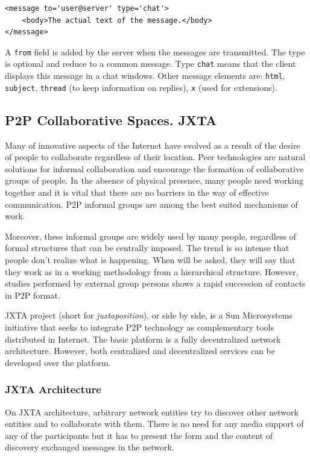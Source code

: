 \begin{verbatim}
<message to='user@server' type='chat'>
    <body>The actual text of the message.</body>
</message>
\end{verbatim}

A \texttt{from} field is added by the server when the messages are
transmitted. The type is optional and reduce to a common message. Type
\texttt{chat} means that the client displays this message in a chat windows.
Other message elements are: \texttt{html}, \texttt{subject}, \texttt{thread}
(to keep information on replies), \texttt{x} (used for extensions).

\subsection{P2P Collaborative Spaces. JXTA}

Many of innovative aspects of the Internet have evolved as a result of the
desire of people to collaborate regardless of their location.  Peer
technologies are natural solutions for informal collaboration and encourage
the formation of collaborative groups of people. In the absence of physical
presence, many people need working together and it is vital that there are no
barriers in the way of effective communication. P2P informal groups are among
the best suited mechanisms of work.

Moreover, these informal groups are widely used by many people, regardless of
formal structures that can be centrally imposed. The trend is so intense that
people don't realize what is happening. When will be asked, they will say that
they work as in a working methodology from a hierarchical structure. However,
studies performed by external group persons shows a rapid succession of
contacts in P2P format.

JXTA project (short for \textit{juxtaposition}), or side by side, is a Sun
Microsystems initiative that seeks to integrate P2P technology as
complementary tools distributed in Internet. The basic platform is a fully
decentralized network architecture. However, both centralized and
decentralized services can be developed over the platform.

\subsubsection{JXTA Architecture}

On JXTA architecture, arbitrary network entities try to discover other network
entities and to collaborate with them. There is no need for any media support
of any of the participants but it has to present the form and the content of
discovery exchanged messages in the network.

